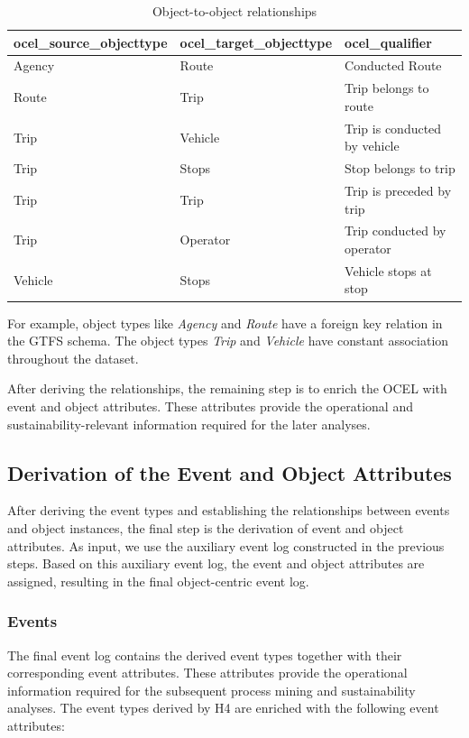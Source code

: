 \begin{table}[h]
\centering
\caption{Object-to-object relationships}
\begin{tabular}{lll}
\toprule
\textbf{ocel\_source\_objecttype } & \textbf{ocel\_target\_objecttype} & \textbf{ocel\_qualifier} \\
\midrule
Agency & Route & Conducted Route\\
Route & Trip  & Trip belongs to route \\
Trip & Vehicle  & Trip is conducted by vehicle \\
Trip  & Stops  & Stop belongs to trip \\
Trip  & Trip  & Trip is preceded by trip \\
Trip  & Operator  & Trip conducted by operator \\
Vehicle & Stops  & Vehicle stops at stop \\
\bottomrule
\end{tabular}
\label{tab:o2o_relationships}
\end{table}
For example, object types like \textit{Agency} and \textit{Route} have a foreign key relation in the GTFS schema. The object types \textit{Trip} and \textit{Vehicle} have constant association throughout the dataset.


After deriving the relationships, the remaining step is to enrich the OCEL with event and object attributes. These attributes provide the operational and sustainability-relevant information required for the later analyses.
\newpage
\subsection{Derivation of the Event and Object Attributes}
After deriving the event types and establishing the relationships between events and object instances, the final step is the derivation of event and object attributes. As input, we use the auxiliary event log constructed in the previous steps. Based on this auxiliary event log, the event and object attributes are assigned, resulting in the final object-centric event log.


\subsubsection{Events}
The final event log contains the derived event types together with their corresponding event attributes. These attributes provide the operational information required for the subsequent process mining and sustainability analyses.
The event types derived by H4 are enriched with the following event attributes:

